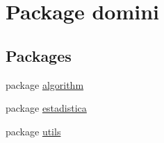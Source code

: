 \hypertarget{namespacedomini}{}\section{Package domini}
\label{namespacedomini}
\subsection*{Packages}
\begin{DoxyCompactItemize}
\item 
package \hyperlink{namespacedomini_1_1algorithm}{algorithm}
\item 
package \hyperlink{namespacedomini_1_1estadistica}{estadistica}
\item 
package \hyperlink{namespacedomini_1_1utils}{utils}
\end{DoxyCompactItemize}
